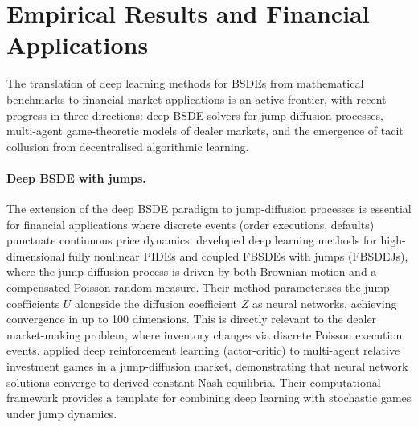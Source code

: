 
\section{Empirical Results and Financial Applications}\label{sec:lit-empirical-revised}

The translation of deep learning methods for BSDEs from mathematical
benchmarks to financial market applications is an active frontier,
with recent progress in three directions: deep BSDE solvers for
jump-diffusion processes, multi-agent game-theoretic models of dealer
markets, and the emergence of tacit collusion from decentralised
algorithmic learning.

\paragraph{Deep BSDE with jumps.}
The extension of the deep BSDE paradigm to jump-diffusion processes
is essential for financial applications where discrete events (order
executions, defaults) punctuate continuous price dynamics.
\citet{wang2023} developed deep learning methods for high-dimensional
fully nonlinear PIDEs and coupled FBSDEs with jumps (FBSDEJs), where
the jump-diffusion process is driven by both Brownian motion and a
compensated Poisson random measure.  Their method parameterises the
jump coefficients $U$ alongside the diffusion coefficient $Z$ as
neural networks, achieving convergence in up to 100 dimensions.
This is directly relevant to the dealer market-making problem, where
inventory changes via discrete Poisson execution events.
\citet{lu2024} applied deep reinforcement learning (actor-critic)
to multi-agent relative investment games in a jump-diffusion market,
demonstrating that neural network solutions converge to derived
constant Nash equilibria.  Their computational framework provides a
template for combining deep learning with stochastic games under
jump dynamics.

